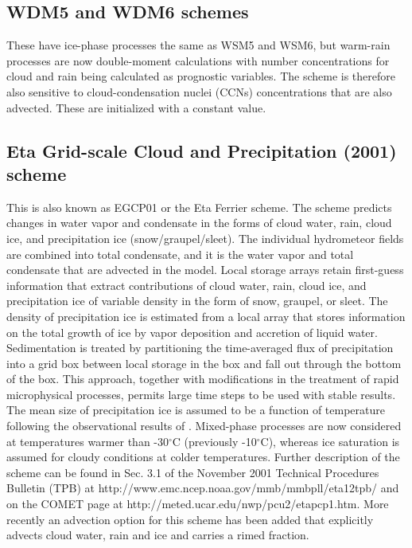 \subsection{WDM5 and WDM6 schemes}

These have ice-phase processes the same as WSM5 and WSM6, but warm-rain processes are now double-moment calculations \citep{lim10} with number concentrations for cloud and rain being calculated as prognostic variables. The scheme is therefore also sensitive to cloud-condensation nuclei (CCNs) concentrations that are also advected. These are initialized with a constant value. 

\subsection{Eta Grid-scale Cloud and Precipitation (2001) scheme}

This is also known as EGCP01 or the Eta Ferrier scheme. The scheme predicts changes 
in water vapor and condensate in the forms of cloud water, rain, cloud 
ice, and precipitation ice (snow/graupel/sleet).  The individual hydrometeor 
fields are combined into total condensate, and it is the water vapor 
and total condensate that are advected in the model. 
Local storage arrays retain first-guess information that extract 
contributions of cloud water, rain, cloud ice, and precipitation ice of 
variable density in the form of snow, graupel, or sleet. The density of 
precipitation ice is estimated from a local array that stores information 
on the total growth of ice by vapor deposition and accretion of liquid water. 
Sedimentation is treated by partitioning the time-averaged flux of 
precipitation into a grid box between local storage in the box and 
fall out through the bottom of the box. This approach, together with 
modifications in the treatment of rapid microphysical processes, permits 
large time steps to be used with stable results. The mean size of 
precipitation ice is assumed to be a function of temperature following 
the observational results of \citet{ryan96}. Mixed-phase processes are 
now considered at temperatures warmer than -30$^\circ$C (previously 
-10$^\circ$C), 
whereas ice saturation 
is assumed for cloudy conditions at colder temperatures. Further 
description of the scheme can be found in Sec. 3.1 of the November 
2001 Technical Procedures Bulletin (TPB) at 
http://www.emc.ncep.noaa.gov/mmb/mmbpll/eta12tpb/ and 
on the COMET page at http://meted.ucar.edu/nwp/pcu2/etapcp1.htm. 
More recently an advection option for this scheme has been added that explicitly advects cloud water, rain and ice
and carries a rimed fraction.

